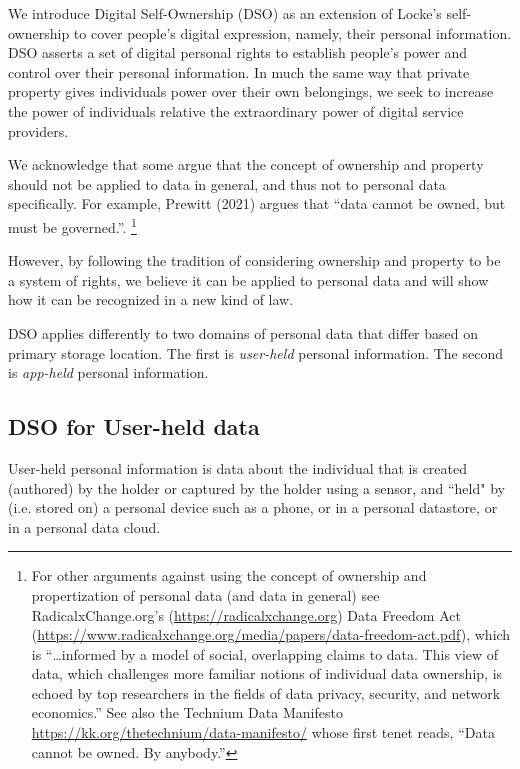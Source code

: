 \documentclass[11pt, oneside]{article}   	%
\begin{document}
We introduce Digital Self-Ownership (DSO) as an extension of Locke's self-ownership to cover people's digital expression, namely, their personal information. DSO asserts a set of digital personal rights to establish people's power and control over their personal information. In much the same way that private property gives individuals power over their own belongings, we seek to increase the power of individuals relative the extraordinary power of digital service providers. 

We acknowledge that some argue that the concept of ownership and property should not be applied to data in general, and thus not to personal data specifically. For example, Prewitt (2021) argues that “data cannot be owned, but must be governed.”\cite{Prewitt2021}. \footnote{For other arguments against using the concept of ownership and propertization of personal data (and data in general) see RadicalxChange.org's (\url{https://radicalxchange.org}) Data Freedom Act (\url{https://www.radicalxchange.org/media/papers/data-freedom-act.pdf}), which is “…informed by a model of social, overlapping claims to data. This view of data, which challenges more familiar notions of individual data ownership, is echoed by top researchers in the fields of data privacy, security, and network economics.” See also the Technium Data Manifesto \url{https://kk.org/thetechnium/data-manifesto/} whose first tenet reads, “Data cannot be owned. By anybody.”}

However, by following the tradition of considering ownership and property to be a system of rights, we believe it can be applied to personal data and will show how it can be recognized in a new kind of law.

DSO applies differently to two domains of personal data that differ based on primary storage location. The first is \emph{user-held}\cite{Jurcys2021} personal information. The second is \emph{app-held} personal information. 

\subsection{DSO for User-held data}

User-held personal information is data about the individual that is created (authored) by the holder or captured by the holder using a sensor, and ``held" by (i.e. stored on) a personal device such as a phone, or in a personal datastore, or in a personal data cloud. 
\end{document}
